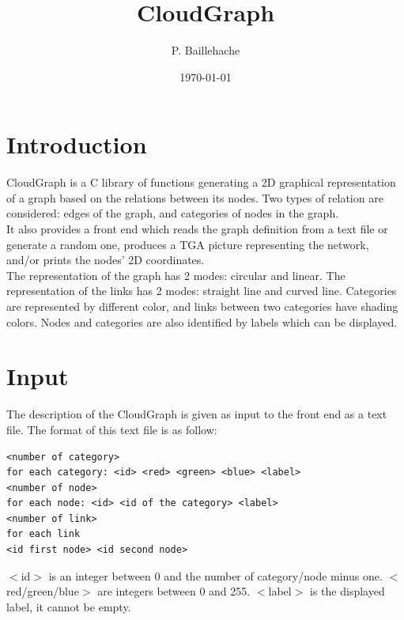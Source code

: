 \documentclass[12pt, a4paper]{article}
\begin{document}
\title{CloudGraph}
\author{P. Baillehache}
\date{\today}
\maketitle

\tableofcontents

\section*{Introduction}

CloudGraph is a C library of functions generating a 2D graphical representation of a graph based on the relations between its nodes. Two types of relation are considered: edges of the graph, and categories of nodes in the graph.\\

It also provides a front end which reads the graph definition from a text file or generate a random one, produces a TGA picture representing the network, and/or prints the nodes' 2D coordinates.\\

The representation of the graph has 2 modes: circular and linear. The representation of the links has 2 modes: straight line and curved line. Categories are represented by different color, and links between two categories have shading colors. Nodes and categories are also identified by labels which can be displayed.\\

\section{Input}

The description of the CloudGraph is given as input to the front end as a text file. The format of this text file is as follow:\\

\begin{scriptsize}
\begin{ttfamily}
\begin{lstlisting}
<number of category>
for each category: <id> <red> <green> <blue> <label> 
<number of node>
for each node: <id> <id of the category> <label>
<number of link>
for each link
<id first node> <id second node>
\end{lstlisting}
\end{ttfamily}
\end{scriptsize}

$<$id$>$ is an integer between 0 and the number of category/node minus one. $<$red/green/blue$>$ are integers between 0 and 255. $<$label$>$ is the displayed label, it cannot be empty.\\
\end{document}
